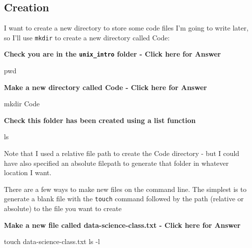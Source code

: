 \documentclass[
]{book}
\newenvironment{Shaded}{\begin{snugshade}}{\end{snugshade}}
\newcommand{\AttributeTok}[1]{\textcolor[rgb]{0.77,0.63,0.00}{#1}}
\newcommand{\BuiltInTok}[1]{#1}
\newcommand{\FunctionTok}[1]{\textcolor[rgb]{0.00,0.00,0.00}{#1}}
\newcommand{\NormalTok}[1]{#1}
\begin{document}
\hypertarget{creation}{%
\subsection{Creation}\label{creation}}

I want to create a new directory to store some code files I'm going to write later, so I'll use \texttt{mkdir} to create a new directory called Code:

\textbf{Check you are in the \texttt{unix\_intro} folder - Click here for Answer}

\begin{Shaded}
\begin{Highlighting}[]
\BuiltInTok{pwd}
\end{Highlighting}
\end{Shaded}

\textbf{Make a new directory called Code - Click here for Answer}

\begin{Shaded}
\begin{Highlighting}[]
\FunctionTok{mkdir}\NormalTok{ Code}
\end{Highlighting}
\end{Shaded}

\textbf{Check this folder has been created using a list function}

\begin{Shaded}
\begin{Highlighting}[]
\FunctionTok{ls}
\end{Highlighting}
\end{Shaded}

Note that I used a relative file path to create the Code directory - but I could have also specified an absolute filepath to generate that folder in whatever location I want.

There are a few ways to make new files on the command line. The simplest is to generate a blank file with the \texttt{touch} command followed by the path (relative or absolute) to the file you want to create

\textbf{Make a new file called data-science-class.txt - Click here for Answer}

\begin{Shaded}
\begin{Highlighting}[]
\FunctionTok{touch}\NormalTok{ data{-}science{-}class.txt}
\FunctionTok{ls} \AttributeTok{{-}l}
\end{Highlighting}
\end{Shaded}
\end{document}
